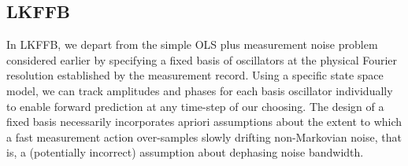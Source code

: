 \subsection{LKFFB \label{sec:app:subsec:LKFFB}}
 In LKFFB, we depart from the simple OLS plus measurement noise problem considered earlier by specifying a fixed basis of oscillators at the physical Fourier resolution established by the measurement record. Using a specific state space model, we can track amplitudes and phases for each basis oscillator individually to enable forward prediction at any time-step of our choosing. The design of a fixed basis necessarily incorporates apriori assumptions about the extent to which a fast measurement action over-samples slowly drifting non-Markovian noise, that is, a (potentially incorrect) assumption about dephasing noise bandwidth.
 
